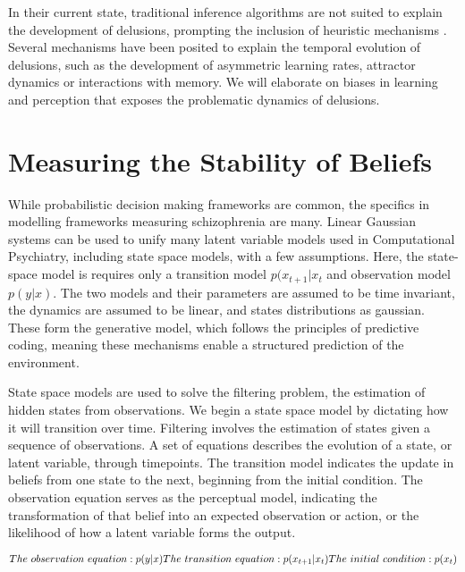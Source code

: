 \documentclass{article}
\begin{document}
In their current state, traditional inference algorithms are not suited to explain the development of delusions, prompting the inclusion of heuristic mechanisms \citep{harding2024new}. Several mechanisms have been posited to explain the temporal evolution of delusions, such as the development of asymmetric learning rates, attractor dynamics or interactions with memory. We will elaborate on biases in learning and perception that exposes the problematic dynamics of delusions.

\section{Measuring the Stability of Beliefs}\label{measuring_stability}

While probabilistic decision making frameworks are common, the specifics in modelling frameworks measuring schizophrenia are many. Linear Gaussian systems can be used to unify many latent variable models used in Computational Psychiatry, including state space models, with a few assumptions. Here, the state-space model is requires only a transition model $p(x_{t+1} | x_t$ and observation model $p(y|x)$. The two models and their parameters are assumed to be time invariant, the dynamics are assumed to be linear, and states distributions as gaussian. These form the generative model, which follows the principles of predictive coding, meaning these mechanisms enable a structured prediction of the environment.

State space models are used to solve the filtering problem, the estimation of hidden states from observations. We begin a state space model by dictating how it will transition over time. Filtering involves the estimation of states given a sequence of observations. A set of equations describes the evolution of a state, or latent variable, through timepoints. The transition model indicates the update in beliefs from one state to the next, beginning from the initial condition. The observation equation serves as the perceptual model, indicating the transformation of that belief into an expected observation or action, or the likelihood of how a latent variable forms the output.

\begin{equation}\label{ssm}
The \ observation \ equation : p(y|x)                             \\
The \ transition \ equation:  p(x_{t+1} | x_t)
The \ initial \ condition: p(x_t)
\end{equation}
\end{document}
